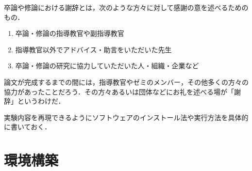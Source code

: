 \documentclass[a4j,titlepage,11pt]{jarticle}
\begin{document}
\begin{acknowledgement}
卒論や修論における謝辞とは，次のような方々に対して感謝の意を述べるためのもの．

\begin{enumerate}
  \item 卒論・修論の指導教官や副指導教官
  \item 指導教官以外でアドバイス・助言をいただいた先生
  \item 卒論・修論の研究に協力していただいた人・組織・企業など
\end{enumerate}

論文が完成するまでの間には，指導教官やゼミのメンバー，その他多くの方々の協力があったことだろう．その方々あるいは団体などにお礼を述べる場が「謝辞」というわけだ．
\end{acknowledgement}


\SupplementBegin

実験内容を再現できるようにソフトウェアのインストール法や実行方法を具体的に書いておく．

\section{環境構築} %



\end{document}
